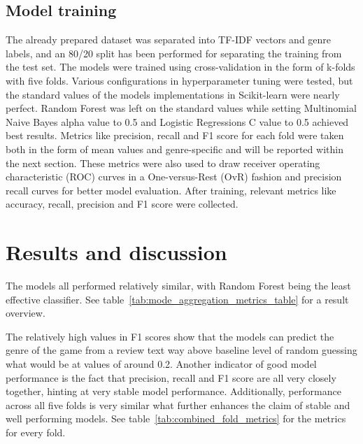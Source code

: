 \documentclass[11pt, a4paper]{article}
\begin{document}
\subsection{Model training}\label{subsec:model-training}
The already prepared dataset was separated into TF-IDF vectors and genre labels, and an 80/20 split has been performed
for separating the training from the test set.
The models were trained using cross-validation in the form of k-folds with five folds.
Various configurations in hyperparameter tuning were tested, but the standard values of the models implementations in
Scikit-learn were nearly perfect.
Random Forest was left on the standard values while setting Multinomial Naive Bayes alpha value to 0.5 and Logistic
Regressions C value to 0.5 achieved best results.
Metrics like precision, recall and F1 score for each fold were taken both in the form of mean values and
genre-specific and will be reported within the next section.
These metrics were also used to draw receiver operating characteristic (ROC) curves in a One-versus-Rest (OvR) fashion
and precision recall curves for better model evaluation.
After training, relevant metrics like accuracy, recall, precision and F1 score were collected.

\section{Results and discussion}\label{sec:results-and-discussion}
The models all performed relatively similar, with Random Forest being the least effective classifier.
See table~\ref{tab:mode_aggregation_metrics_table} for a result overview.



The relatively high values in F1 scores show that the models can predict the genre of the game from a review text way
above baseline level of random guessing what would be at values of around 0.2.
Another indicator of good model performance is the fact that precision, recall and F1 score are all very closely
together, hinting at very stable model performance.
Additionally, performance across all five folds is very similar what further enhances the claim of stable and well
performing models.
See table~\ref{tab:combined_fold_metrics} for the metrics for every fold.


\end{document}

